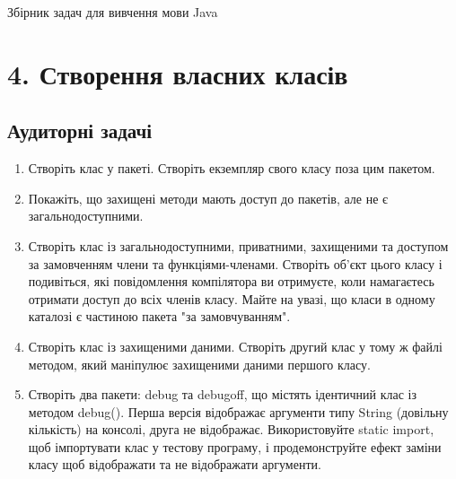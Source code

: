 \documentclass[]{article}
\date{}
\begin{document}
Збірник задач для вивчення мови Java


\section{4. Створення власних класів}

\subsection{Аудиторні задачі}
\begin{enumerate}
\def\labelenumi{1.\arabic{enumi}.}

\item
Створіть клас у пакеті. Створіть екземпляр свого класу поза цим пакетом.
\item
Покажіть, що захищені методи мають доступ до пакетів, але не є загальнодоступними.
\item
 Створіть клас із загальнодоступними, приватними, захищеними та доступом за замовченням члени та функціями-членами. Створіть об’єкт цього класу і подивіться, які повідомлення компілятора ви отримуєте, коли намагаєтесь отримати доступ до всіх членів класу. Майте на увазі, що класи в одному каталозі є частиною пакета "за замовчуванням".
\item
 Створіть клас із захищеними даними. Створіть другий клас у тому ж файлі методом, який маніпулює захищеними даними першого класу.
\item
 Створіть два пакети: debug та debugoff, що містять ідентичний клас із методом debug(). Перша версія відображає аргументи типу String
(довільну кількість) на консолі, друга не відображає. Використовуйте static import, щоб імпортувати клас у тестову програму, і продемонструйте ефект заміни класу щоб відображати та не відображати аргументи.

\end{enumerate}
\end{document}
